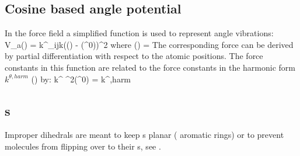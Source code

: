 \subsection{Cosine based angle potential}
\label{sec:cosangle}
In the  force field a simplified function is used to represent angle
vibrations:
\beq
V_a(\tijk) = \half k^{\theta}_{ijk}\left(\cos(\tijk) - \cos(\tijk^0)\right)^2
\eeq
where 
\beq
\cos(\tijk) = 
\eeq
The corresponding force can be derived by partial differentiation with respect
to the atomic positions. The force constants in this function are related
to the force constants in the harmonic form $k^{\theta,harm}$
() by:
\beq
k^{\theta} \sin^2(\tijk^0) = k^{\theta,harm}
\eeq

\newcommand{\rvkj}{{\bf r}_{kj}}
\newcommand{\rkj}{r_{kj}}

\subsection{s}
Improper dihedrals are meant to keep s planar ({\eg} 
aromatic rings) or to prevent molecules from flipping over to their
s, see .

